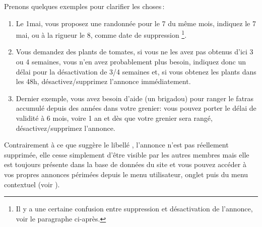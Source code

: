 Prenons quelques exemples pour clarifier les choses\,:
\begin{enumerate}
    \item Le 1\ier mai, vous proposez une randonnée pour le 7 du même mois, indiquez le 7 mai, ou à la rigueur le 8, comme date de suppression%
    \footnote{Il y a une certaine confusion entre suppression et désactivation de l'annonce, voir le paragraphe ci-après.}.
    \item  Vous demandez des plants de tomates, si vous ne les avez pas obtenus d'ici 3 ou 4 semaines, vous n'en avez probablement plus besoin, indiquez donc un délai pour la désactivation de 3/4 semaines et, si vous obtenez les plants dans les 48h, désactivez/supprimez l'annonce immédiatement.
    \item Dernier exemple, vous avez besoin d'aide (un brigadou) pour ranger le fatras accumulé depuis des années dans votre grenier: vous pouvez porter le délai de validité à 6 mois, voire 1 an et dès que votre grenier sera rangé, désactivez/supprimez l'annonce.
\end{enumerate}

Contrairement à ce que suggère le libellé , l'annonce n'est pas réellement supprimée, elle cesse simplement d'être visible par les autres membres mais elle est toujours présente dans la base de données du site et vous pouvez accéder à vos propres annonces périmées depuis le  menu utilisateur, onglet  puis  du menu contextuel  (voir ).

